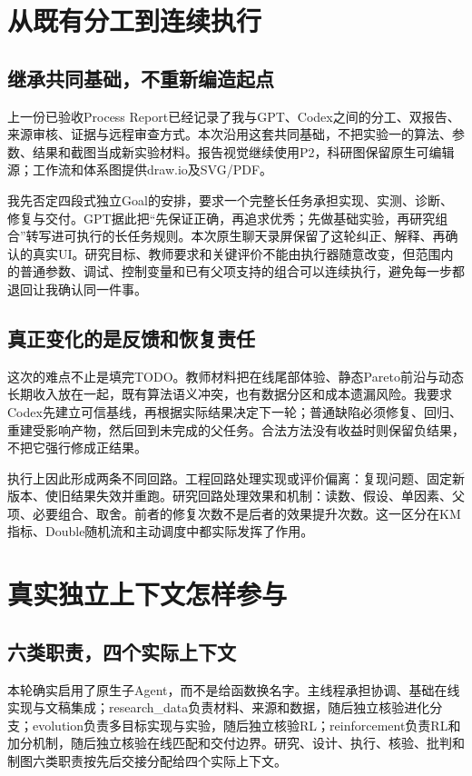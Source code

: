 \section{从既有分工到连续执行}
\subsection{继承共同基础，不重新编造起点}
上一份已验收Process Report已经记录了我与GPT、Codex之间的分工、双报告、来源审核、证据与远程审查方式。本次沿用这套共同基础，不把实验一的算法、参数、结果和截图当成新实验材料。报告视觉继续使用P2，科研图保留原生可编辑源；工作流和体系图提供draw.io及SVG/PDF。

我先否定四段式独立Goal的安排，要求一个完整长任务承担实现、实测、诊断、修复与交付。GPT据此把“先保证正确，再追求优秀；先做基础实验，再研究组合”转写进可执行的长任务规则。本次原生聊天录屏保留了这轮纠正、解释、再确认的真实UI。研究目标、教师要求和关键评价不能由执行器随意改变，但范围内的普通参数、调试、控制变量和已有父项支持的组合可以连续执行，避免每一步都退回让我确认同一件事。

\subsection{真正变化的是反馈和恢复责任}
这次的难点不止是填完TODO。教师材料把在线尾部体验、静态Pareto前沿与动态长期收入放在一起，既有算法语义冲突，也有数据分区和成本遗漏风险。我要求Codex先建立可信基线，再根据实际结果决定下一轮；普通缺陷必须修复、回归、重建受影响产物，然后回到未完成的父任务。合法方法没有收益时则保留负结果，不把它强行修成正结果。

执行上因此形成两条不同回路。工程回路处理实现或评价偏离：复现问题、固定新版本、使旧结果失效并重跑。研究回路处理效果和机制：读数、假设、单因素、父项、必要组合、取舍。前者的修复次数不是后者的效果提升次数。这一区分在KM指标、Double随机流和主动调度中都实际发挥了作用。

\section{真实独立上下文怎样参与}
\subsection{六类职责，四个实际上下文}
本轮确实启用了原生子Agent，而不是给函数换名字。主线程承担协调、基础在线实现与文稿集成；research\_data负责材料、来源和数据，随后独立核验进化分支；evolution负责多目标实现与实验，随后独立核验RL；reinforcement负责RL和加分机制，随后独立核验在线匹配和交付边界。研究、设计、执行、核验、批判和制图六类职责按先后交接分配给四个实际上下文。

